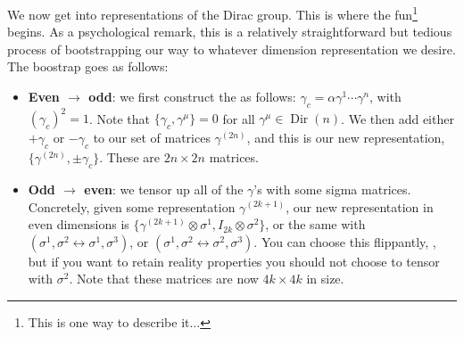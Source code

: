 \documentclass[11pt]{article}
\begin{document}
We now get into representations of the Dirac group.
This is where the fun\footnote{This is one way to describe
it$\ldots$} begins. As a psychological remark, this is a relatively straightforward
but tedious process of bootstrapping our way to whatever dimension
representation we desire. The boostrap goes as follows:
\begin{itemize}
    \item \textbf{Even $\to$ odd}: we first construct the 
    as follows: $\gamma_c = \alpha \gamma^1 \cdots \gamma^n$,
    with $(\gamma_c)^2 = 1$. Note that $\{ \gamma_c, \gamma^\mu \} = 0$
    for all $\gamma^\mu \in \operatorname{Dir}(n)$. We then
    add either $+ \gamma_c$ or $- \gamma_c$ to our set of matrices
    $\gamma^{(2n)}$, and this is our new representation, $\{ \gamma^{(2n)}, \pm \gamma_c \}$.
    These are $2n \times 2n$ matrices.
    \item \textbf{Odd $\to$ even}: we tensor up all of the $\gamma$'s with some sigma matrices. 
    Concretely, given some representation $\gamma^{(2k + 1)}$, our new representation 
    in even dimensions is $\{ \gamma^{(2k + 1)} \otimes \sigma^1, I_{2k} \otimes \sigma^2 \}$,
    or the same with $(\sigma^1, \sigma^2 \leftrightarrow \sigma^1, \sigma^3)$,
    or $(\sigma^1, \sigma^2 \leftrightarrow \sigma^2, \sigma^3)$.
    You can choose this flippantly, , 
    but if you want to retain reality properties you should not
    choose to tensor with $\sigma^2$. Note that these matrices
    are now $4k \times 4k$ in size.
\end{itemize}
\end{document}
